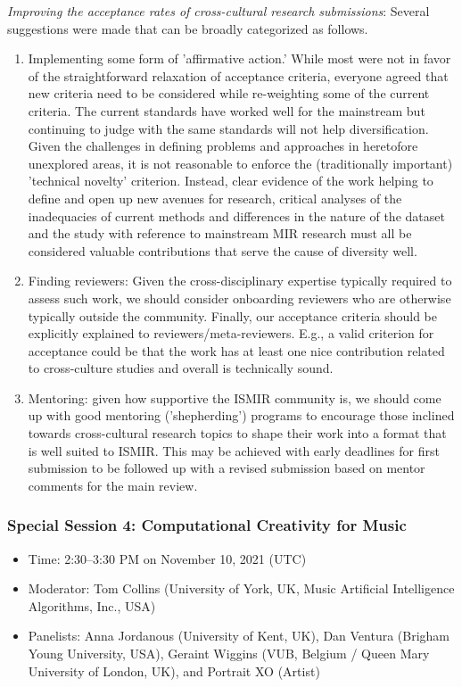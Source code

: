 \documentclass[%
10pt,								%
titlepage,						%
]
{scrartcl}
\begin{document}
                \textit{Improving the acceptance rates of cross-cultural research submissions}: Several suggestions were made that can be broadly categorized as follows.
                    \begin{enumerate}
                        \item   Implementing some form of 'affirmative action.'  While most were not in favor of the straightforward relaxation of acceptance criteria, everyone agreed that new criteria need to be considered while re-weighting some of the current criteria. The current standards have worked well for the mainstream but continuing to judge with the same standards will not help diversification. Given the challenges in defining problems and approaches in heretofore unexplored areas, it is not reasonable to enforce the (traditionally important) 'technical novelty' criterion. Instead, clear evidence of the work helping to define and open up new avenues for research, critical analyses of the inadequacies of current methods and differences in the nature of the dataset and the study with reference to mainstream MIR research must all be considered valuable contributions that serve the cause of diversity well.
                        \item   Finding reviewers: Given the cross-disciplinary expertise typically required to assess such work, we should consider onboarding reviewers who are otherwise typically outside the community. Finally, our acceptance criteria should be explicitly explained to reviewers/meta-reviewers. E.g., a valid criterion for acceptance could be that the work has at least one nice contribution related to cross-culture studies and overall is technically sound.
                        \item   Mentoring: given how supportive the ISMIR community is, we should come up with good mentoring ('shepherding') programs to encourage those inclined towards cross-cultural research topics to shape their work into a format that is well suited to ISMIR.  This may be achieved with early deadlines for first submission to be followed up with a revised submission based on mentor comments for the main review.
                    \end{enumerate}


        \subsubsection{Special Session 4: Computational Creativity for Music}
        \begin{itemize}
            \item Time: 2:30--3:30 PM on November 10, 2021 (UTC)

            \item   Moderator: Tom Collins (University of York, UK, Music Artificial Intelligence Algorithms, Inc., USA)

            \item   Panelists: Anna Jordanous (University of Kent, UK), Dan Ventura (Brigham Young University, USA), Geraint Wiggins (VUB, Belgium / Queen Mary University of London, UK), and Portrait XO (Artist)
        \end{itemize}
\end{document}
